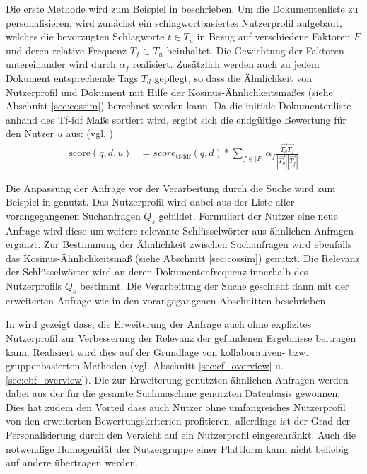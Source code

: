 Die erste Methode wird zum Beispiel in \citep{Durao12} beschrieben. Um die Dokumentenliste zu personalisieren, wird zunächst ein schlagwortbasiertes Nutzerprofil aufgebaut, welches die bevorzugten Schlagworte $t \in T_u$ in Bezug auf verschiedene Faktoren $F$ und deren relative Frequenz $T_f \subset T_u$ beinhaltet. Die Gewichtung der Faktoren untereinander wird durch $\alpha_f$ realisiert. Zusätzlich werden auch zu jedem Dokument entsprechende Tags $T_d$ gepflegt, so dass die Ähnlichkeit von Nutzerprofil und Dokument mit Hilfe der Kosinus-Ähnlichkeitsmaßes (siehe Abschnitt \ref{sec:cossim}) berechnet werden kann. Da die initiale Dokumentenliste anhand des Tf-idf Maßs sortiert wird, ergibt sich die endgültige Bewertung für den Nutzer $u$ aus:  (vgl. \citep{Durao12})
\begin{align}
\text{score}(q,d,u) & = score_{\text{tf-idf}}(q,d) * \sum_{f \in |F|}{\alpha_f \frac{\overrightarrow{T_d} \overrightarrow{T_f}}{|\overrightarrow{T_d}| |\overrightarrow{T_f}|}}
\end{align}

Die Anpassung der Anfrage vor der Verarbeitung durch die Suche wird zum Beispiel in \citep{Boughareb11} genutzt. Das Nutzerprofil wird dabei aus der Liste aller vorangegangenen Suchanfragen $Q_s$ gebildet. Formuliert der Nutzer eine neue Anfrage wird diese um weitere relevante Schlüsselwörter aus ähnlichen Anfragen ergänzt. Zur Bestimmung der Ähnlichkeit zwischen Suchanfragen wird ebenfalls das Kosinus-Ähnlichkeitsmaß (siehe Abschnitt \ref{sec:cossim}) genutzt. Die Relevanz der Schlüsselwörter wird an deren Dokumentenfrequenz innerhalb des Nutzerprofils $Q_s$ bestimmt. Die Verarbeitung der Suche geschieht dann mit der erweiterten Anfrage wie in den vorangegangenen Abschnitten beschrieben.

In \citep{smyth05a} wird gezeigt dass, die Erweiterung der Anfrage auch ohne explizites Nutzerprofil zur Verbesserung der Relevanz der gefundenen Ergebnisse beitragen kann. Realisiert wird dies auf der Grundlage von kollaborativen- bzw. gruppenbasierten Methoden (vgl. Abschnitt \ref{sec:cf_overview} u. \ref{sec:cbf_overview}). Die zur Erweiterung genutzten ähnlichen Anfragen werden dabei aus der für die gesamte Suchmaschine genutzten Datenbasis gewonnen. Dies hat zudem den Vorteil dass auch Nutzer ohne umfangreiches Nutzerprofil von den erweiterten Bewertungskriterien profitieren, allerdings ist der Grad der Personalisierung durch den Verzicht auf ein Nutzerprofil eingeschränkt. Auch die notwendige Homogenität der Nutzergruppe einer Plattform kann nicht beliebig auf andere übertragen werden. \citep{smyth05a}

